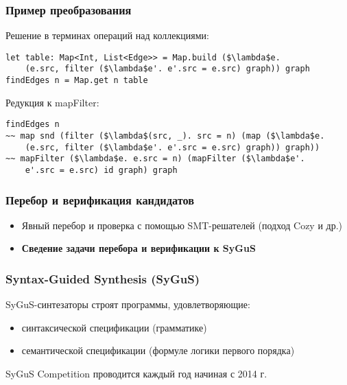 \documentclass[14pt]{beamer}
\begin{document}
\begin{frame}[fragile]
\frametitle{Пример преобразования}
Решение в терминах операций над коллекциями:
\begin{lstlisting}[language=SolutionLang, mathescape=true]
let table: Map<Int, List<Edge>> = Map.build ($\lambda$e.
    (e.src, filter ($\lambda$e'. e'.src = e.src) graph)) graph
findEdges n = Map.get n table
\end{lstlisting}

Редукция к {\color{blue}mapFilter}:
\begin{lstlisting}[language=SolutionLang, mathescape=true]
findEdges n
~~ map snd (filter ($\lambda$(src, _). src = n) (map ($\lambda$e.
    (e.src, filter ($\lambda$e'. e'.src = e.src) graph)) graph))
~~ mapFilter ($\lambda$e. e.src = n) (mapFilter ($\lambda$e'.
    e'.src = e.src) id graph) graph
\end{lstlisting}
\end{frame}


\begin{frame}
\frametitle{Перебор и верификация кандидатов}
\begin{itemize}
    \item Явный перебор и проверка с помощью SMT-решателей (подход Cozy и др.)
    \item \textbf{Сведение задачи перебора и верификации к SyGuS}
\end{itemize}
\end{frame}


\begin{frame}
\frametitle{Syntax-Guided Synthesis (SyGuS)}
SyGuS-синтезаторы строят программы, удовлетворяющие:
\begin{itemize}
    \item синтаксической спецификации (грамматике)
    \item семантической спецификации (формуле логики первого порядка)
\end{itemize}
SyGuS Competition проводится каждый год начиная с 2014 г.
\end{frame}
\end{document}
